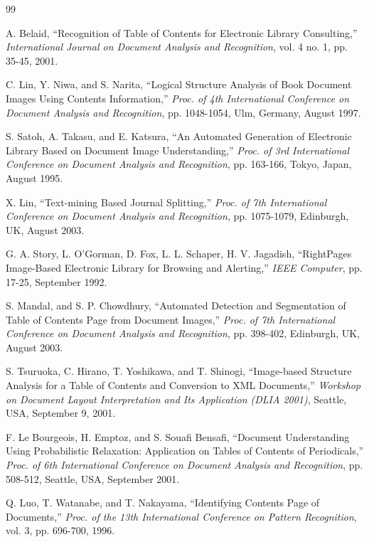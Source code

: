 \documentclass[10pt]{article}
\begin{document}
\begin{thebibliography}{99}

 A. Belaid, ``Recognition of Table of Contents for Electronic Library Consulting,'' \textit{International Journal on Document Analysis and Recognition}, vol. 4 no. 1, pp. 35-45, 2001.

 C. Lin, Y. Niwa, and S. Narita, ``Logical Structure Analysis of Book Document Images Using Contents Information,'' \textit{Proc. of 4th International Conference on Document Analysis and Recognition}, pp. 1048-1054, Ulm, Germany, August 1997.

 S. Satoh, A. Takasu, and E. Katsura, ``An Automated Generation of Electronic Library Based on Document Image Understanding,'' \textit{Proc. of 3rd International Conference on Document Analysis and Recognition}, pp. 163-166, Tokyo, Japan, August 1995.

 X. Lin, ``Text-mining Based Journal Splitting,'' \textit{Proc. of 7th International Conference on Document Analysis and Recognition}, pp. 1075-1079, Edinburgh, UK, August 2003.

 G. A. Story, L. O'Gorman, D. Fox, L. L. Schaper, H. V. Jagadish, ``RightPages Image-Based Electronic Library for Browsing and Alerting,'' \textit{IEEE Computer}, pp. 17-25, September 1992.

 S. Mandal, and S. P. Chowdhury, ``Automated Detection and Segmentation of Table of Contents Page from Document Images,'' \textit{Proc. of 7th International Conference on Document Analysis and Recognition}, pp. 398-402, Edinburgh, UK, August 2003.

 S. Tsuruoka, C. Hirano, T. Yoshikawa, and T. Shinogi, ``Image-based Structure Analysis for a Table of Contents and Conversion to XML Documents,'' \textit{Workshop on Document Layout Interpretation and Its Application (DLIA 2001)}, Seattle, USA, September 9, 2001.

 F. Le Bourgeois, H. Emptoz, and S. Souafi Bensafi, ``Document Understanding Using Probabilistic Relaxation: Application on Tables of Contents of Periodicals,'' \textit{Proc. of 6th International Conference on Document Analysis and Recognition}, pp. 508-512, Seattle, USA, September 2001.

 Q. Luo, T. Watanabe, and T. Nakayama, ``Identifying Contents Page of Documents,'' \textit{Proc. of the 13th International Conference on Pattern Recognition}, vol. 3, pp. 696-700, 1996.


\end{thebibliography}
\end{document}
